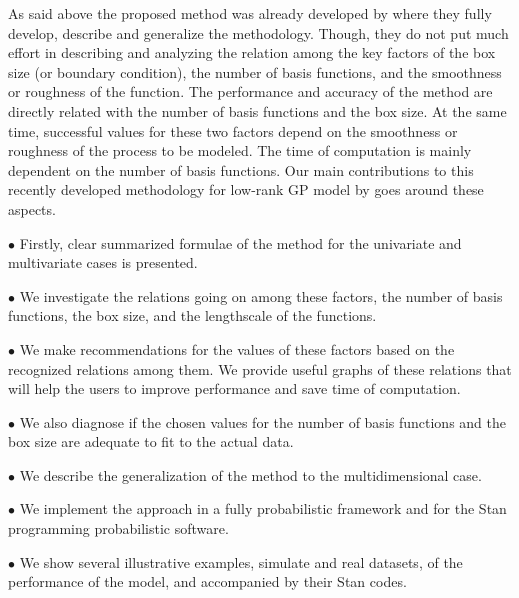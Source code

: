 \documentclass[onecolumn,a4paper,11pt]{article}
\begin{document}
As said above the proposed method was already developed by \cite{solin2018hilbert} where they fully develop, describe and generalize the methodology. Though, they do not put much effort in describing and analyzing the relation among the key factors of the box size (or boundary condition), the number of basis functions, and the smoothness or roughness of the function. The performance and accuracy of the method are directly related with the number of basis functions and the box size. At the same time, successful values for these two factors depend on the smoothness or roughness of the process to be modeled. The time of computation is mainly dependent on the number of basis functions. Our main contributions to this recently developed methodology for low-rank GP model by \cite{solin2018hilbert} goes around these aspects.

\vspace{2mm}
$\bullet$ Firstly, clear summarized formulae of the method for the univariate and multivariate cases is presented. 

\vspace{2mm}
$\bullet$ We investigate the relations going on among these factors, the number of basis functions, the box size, and the lengthscale of the functions.

\vspace{2mm}
$\bullet$ We make recommendations for the values of these factors based on the recognized relations among them. We provide useful graphs of these relations that will help the users to improve performance and save time of computation.

\vspace{2mm}
$\bullet$ We also diagnose if the chosen values for the number of basis functions and the box size are adequate to fit to the actual data.

\vspace{2mm}
$\bullet$ We describe the generalization of the method to the multidimensional case.

\vspace{2mm}
$\bullet$ We implement the approach in a fully probabilistic framework and for the Stan programming probabilistic software.

\vspace{2mm}
$\bullet$ We show several illustrative examples, simulate and real datasets, of the performance of the model, and accompanied by their Stan codes.

 



\end{document}
